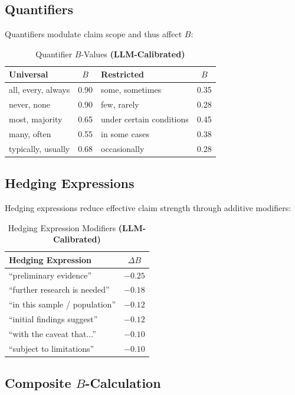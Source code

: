 \documentclass[11pt,a4paper]{article}
\begin{document}
\subsection{Quantifiers}

Quantifiers modulate claim scope and thus affect $B$:

\begin{table}[h]
\centering
\caption{Quantifier $B$-Values \textbf{(LLM-Calibrated)}}
\label{tab:quantifiers}
\begin{tabular}{lc|lc}
\toprule
\textbf{Universal} & \textbf{$B$} & \textbf{Restricted} & \textbf{$B$} \\
\midrule
all, every, always & 0.90 & some, sometimes & 0.35 \\
never, none & 0.90 & few, rarely & 0.28 \\
most, majority & 0.65 & under certain conditions & 0.45 \\
many, often & 0.55 & in some cases & 0.38 \\
typically, usually & 0.68 & occasionally & 0.28 \\
\bottomrule
\end{tabular}
\end{table}

\subsection{Hedging Expressions}

Hedging expressions reduce effective claim strength through additive modifiers:

\begin{table}[h]
\centering
\caption{Hedging Expression Modifiers \textbf{(LLM-Calibrated)}}
\label{tab:hedging}
\begin{tabular}{lc}
\toprule
\textbf{Hedging Expression} & $\Delta B$ \\
\midrule
``preliminary evidence'' & $-0.25$ \\
``further research is needed'' & $-0.18$ \\
``in this sample / population'' & $-0.12$ \\
``initial findings suggest'' & $-0.12$ \\
``with the caveat that...'' & $-0.10$ \\
``subject to limitations'' & $-0.10$ \\
\bottomrule
\end{tabular}
\end{table}

\subsection{Composite $B$-Calculation}
\end{document}
